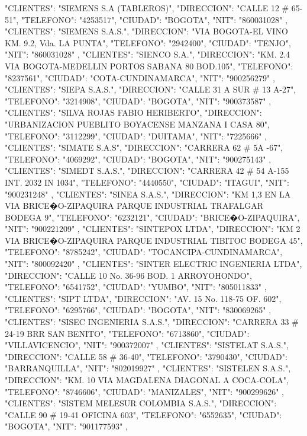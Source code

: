    {
   "CLIENTES": "SIEMENS S.A (TABLEROS)",
   "DIRECCION": "CALLE 12 # 65-51",
   "TELEFONO": "4253517",
   "CIUDAD": "BOGOTA",
   "NIT": "860031028"
   },
   {
   "CLIENTES": "SIEMENS S.A.S.",
   "DIRECCION": "VIA BOGOTA-EL VINO KM. 9.2, Vda. LA PUNTA",
   "TELEFONO": "2942400",
   "CIUDAD": "TENJO",
   "NIT": "860031028"
   },
   {
   "CLIENTES": "SIENCO S.A.",
   "DIRECCION": "KM. 2.4 VIA BOGOTA-MEDELLIN PORTOS SABANA 80 BOD.105",
   "TELEFONO": "8237561",
   "CIUDAD": "COTA-CUNDINAMARCA",
   "NIT": "900256279"
   },
   {
   "CLIENTES": "SIEPA S.A.S.",
   "DIRECCION": "CALLE 31 A SUR # 13 A-27",
   "TELEFONO": "3214908",
   "CIUDAD": "BOGOTA",
   "NIT": "900373587"
   },
   {
   "CLIENTES": "SILVA ROJAS FABIO HERIBERTO",
   "DIRECCION": "URBANIZACION PUEBLITO BOYACENSE MANZANA I CASA 80",
   "TELEFONO": "3112299",
   "CIUDAD": "DUITAMA",
   "NIT": "7225666"
   },
   {
   "CLIENTES": "SIMATE S.A.S",
   "DIRECCION": "CARRERA 62 # 5A -67",
   "TELEFONO": "4069292",
   "CIUDAD": "BOGOTA",
   "NIT": "900275143"
   },
   {
   "CLIENTES": "SIMEDT S.A.S.",
   "DIRECCION": "CARRERA 42 # 54 A-155 INT. 2032 IN 1034",
   "TELEFONO": "4440550",
   "CIUDAD": "ITAGUI",
   "NIT": "900231248"
   },
   {
   "CLIENTES": "SINEA S.A.S.",
   "DIRECCION": "KM 1,3 EN LA VIA BRICE�O-ZIPAQUIRA PARQUE INDUSTRIAL TRAFALGAR BODEGA 9",
   "TELEFONO": "6232121",
   "CIUDAD": "BRICE�O-ZIPAQUIRA",
   "NIT": "900221209"
   },
   {
   "CLIENTES": "SINTEPOX LTDA",
   "DIRECCION": "KM 2 VIA BRICE�O-ZIPAQUIRA PARQUE INDUSTRIAL TIBITOC BODEGA 45",
   "TELEFONO": "8785242",
   "CIUDAD": "TOCANCIPA-CUNDINAMARCA",
   "NIT": "800092420"
   },
   {
   "CLIENTES": "SINTER ELECTRIC INGENIERIA LTDA",
   "DIRECCION": "CALLE 10 No. 36-96 BOD. 1 ARROYOHONDO",
   "TELEFONO": "6541752",
   "CIUDAD": "YUMBO",
   "NIT": "805011833"
   },
   {
   "CLIENTES": "SIPT LTDA",
   "DIRECCION": "AV. 15 No. 118-75 OF. 602",
   "TELEFONO": "6295766",
   "CIUDAD": "BOGOTA",
   "NIT": "830069265"
   },
   {
   "CLIENTES": "SISEC INGENIERIA S.A.S.",
   "DIRECCION": "CARRERA 33 # 24-19 BRR SAN BENITO",
   "TELEFONO": "6713860",
   "CIUDAD": "VILLAVICENCIO",
   "NIT": "900372007"
   },
   {
   "CLIENTES": "SISTELAT S.A.S.",
   "DIRECCION": "CALLE 58 # 36-40",
   "TELEFONO": "3790430",
   "CIUDAD": "BARRANQUILLA",
   "NIT": "802019927"
   },
   {
   "CLIENTES": "SISTELEN S.A.S.",
   "DIRECCION": "KM. 10 VIA MAGDALENA DIAGONAL A COCA-COLA",
   "TELEFONO": "8746606",
   "CIUDAD": "MANIZALES",
   "NIT": "900299626"
   },
   {
   "CLIENTES": "SISTEM MELESUR COLOMBIA S.A.S.",
   "DIRECCION": "CALLE 90 # 19-41 OFICINA 603",
   "TELEFONO": "6552635",
   "CIUDAD": "BOGOTA",
   "NIT": "901177593"
   },
